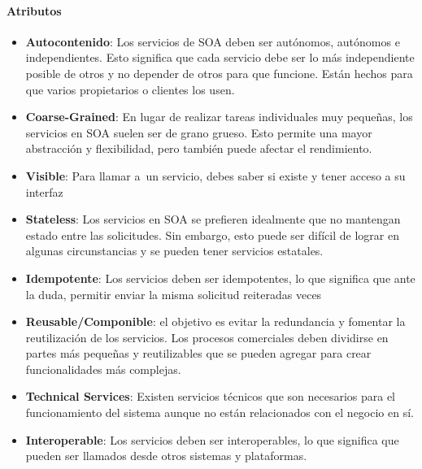 \documentclass{article}
\begin{document}
		\paragraph{Atributos}
			\begin{itemize}		
				\item \textbf{Autocontenido}: Los servicios de SOA deben ser autónomos, autónomos e independientes. Esto significa que cada servicio debe ser lo más independiente posible de otros y no depender de otros para que funcione. Están hechos para que varios propietarios o clientes los usen.
								
				\item \textbf{Coarse-Grained}: En lugar de realizar tareas individuales muy pequeñas, los servicios en SOA suelen ser de grano grueso. Esto permite una mayor abstracción y flexibilidad, pero también puede afectar el rendimiento.
					
				\item \textbf{Visible}: Para llamar a un servicio, debes saber si existe y tener acceso a su interfaz				
				
				\item \textbf{Stateless}: Los servicios en SOA se prefieren idealmente que no mantengan estado entre las solicitudes. Sin embargo, esto puede ser difícil de lograr en algunas circunstancias y se pueden tener servicios estatales.
				
				\item \textbf{Idempotente}: Los servicios deben ser idempotentes, lo que significa que ante la duda, permitir enviar la misma solicitud reiteradas veces
				
				\item \textbf{Reusable/Componible}:  el objetivo es evitar la redundancia y fomentar la reutilización de los servicios. Los procesos comerciales deben dividirse en partes más pequeñas y reutilizables que se pueden agregar para crear funcionalidades más complejas.
				
				\item \textbf{Technical Services}: Existen servicios técnicos que son necesarios para el funcionamiento del sistema aunque no están relacionados con el negocio en sí.
								
				\item \textbf{Interoperable}: Los servicios deben ser interoperables, lo que significa que pueden ser llamados desde otros sistemas y plataformas.
				
			\end{itemize}
		
\end{document}
